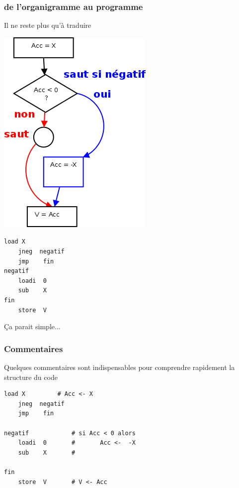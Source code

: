 \begin{frame}[containsverbatim]
  \frametitle{de l'organigramme au programme}
Il ne reste plus qu'à traduire
  \begin{multicols}{2}
\includegraphics[width=0.8\linewidth]{figures/val-abs-4}    
\break
\begin{lstlisting}[frame=single]
    load X         
    jneg  negatif 
    jmp    fin     
negatif
    loadi  0       
    sub    X
fin
    store  V 
\end{lstlisting}
Ça parait simple...
  \end{multicols}
\end{frame}

\begin{frame}[containsverbatim]
  \frametitle{Commentaires}
Quelques \alert{commentaires} sont indispensables
pour comprendre rapidement la structure du code
\begin{lstlisting}[frame=single]
    load X         # Acc <- X
    jneg  negatif   
    jmp    fin       
                    
negatif            # si Acc < 0 alors
    loadi  0       #       Acc <-  -X
    sub    X       #

fin
    store  V       # V <- Acc 
\end{lstlisting}
\end{frame}


